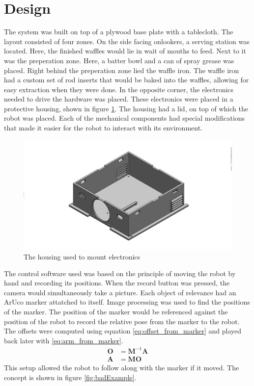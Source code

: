 \section{Design}
The system was built on top of a plywood base plate with a tablecloth. The layout consisted of four zones. On the side facing onlookers, a serving station was located. Here, the finished waffles would lie in wait of mouths to feed. Next to it was the preperation zone. Here, a batter bowl and a can of spray grease was placed. Right behind the preperation zone lied the waffle iron. The waffle iron had a custom set of rod inserts that would be baked into the waffles, allowing for easy extraction when they were done. In the opposite corner, the electronics needed to drive the hardware was placed. These electronics were placed in a protective housing, shown in figure \ref{fig:mechanical}. The housing had a lid, on top of which the robot was placed. Each of the mechanical components had special modifications that made it easier for the robot to interact with its environment.
\vskip1cm
\begin{figure}[h]
    \centering
    \includegraphics[width= 1\linewidth]{figures/boxv3.png}
    \caption{The housing used to mount electronics}
    \label{fig:mechanical}
\end{figure}
The control software used was based on the principle of moving the robot by hand and recording its positions. When the record button was pressed, the camera would simultaneously take a picture. Each object of relevance had an ArUco marker attatched to itself. Image processing was used to find the positions of the marker. The position of the marker would be referenced against the position of the robot to record the relative pose from the marker to the robot. The offsets were computed using equation \eqref{eq:offset_from_marker} and played back later with \eqref{eq:arm_from_marker}.
\begin{align}
    \mathbf{O} &= \mathbf{M}^{-1}\mathbf{A}\label{eq:offset_from_marker}\\
    \mathbf{A} &= \mathbf{M}\mathbf{O} \label{eq:arm_from_marker}
\end{align}
 This setup allowed the robot to follow along with the marker if it moved.  The concept is shown in figure \ref{fig:badExample}. 

